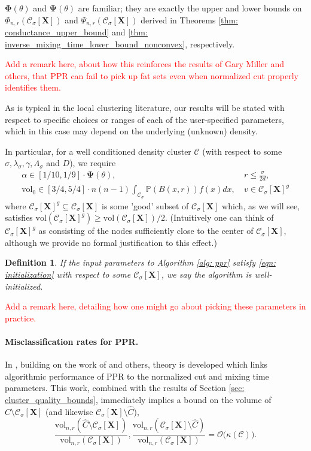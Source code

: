 \documentclass{article}
\newcommand{\vol}{\mathrm{vol}}
\newcommand{\1}{\mathbf{1}}
\newcommand{\Phibf}{\mathbf{\Phi}}
\newcommand{\Psibf}{\mathbf{\Psi}}
\newcommand{\Xbf}{\mathbf{X}}
\newcommand{\Pbb}{\mathbb{P}}
\newcommand{\Cset}{\mathcal{C}}
\newcommand{\Csig}{\Cset_{\sigma}}
\newcommand{\ppr}{{\sc PPR}}
\theoremstyle{aldenthm}
\newtheorem{definition}{Definition}
\theoremstyle{aldenrmrk}
\begin{document}
$\Phibf(\theta)$ and $\Psibf(\theta)$ are familiar; they are exactly the upper and lower bounds on $\Phi_{n,r}(\Csig[\Xbf])$ and $\Psi_{n,r}(\Csig[\Xbf])$ derived in Theorems \ref{thm: conductance_upper_bound} and \ref{thm: inverse_mixing_time_lower_bound_nonconvex}, respectively.

\textcolor{red}{Add a remark here, about how this reinforces the results of Gary Miller and others, that PPR can fail to pick up fat sets even when normalized cut properly identifies them.}

As is typical in the local clustering literature, our results will be stated with respect to specific choices or ranges of each of the user-specified parameters, which in this case may depend on the underlying (unknown) density. 

In particular, for a well conditioned density cluster $\Cset$ (with respect to some $\sigma, \lambda_{\sigma}, \gamma, \Lambda_{\sigma}$ and $D$), we require
\begin{align}
\label{eqn: initialization}
\alpha \in [1/10, 1/9] \cdot \mathbf{\Psi}(\theta), & ~r \leq \frac{\sigma}{2d} \nonumber,  \\
\vol_0 \in [3/4,5/4] \cdot n(n-1) \int_{\Csig} \Pbb(B(x,r)) f(x) dx, & ~v \in \Csig[\Xbf]^g
\end{align}
where $\Csig[\Xbf]^g \subseteq \Csig[\Xbf]$ is some 'good' subset of $\Csig[\Xbf]$ which, as we will see, satisfies $\vol(\Csig[\Xbf]^g) \geq \vol(\Csig[\Xbf])/2$. (Intuitively one can think of $\Csig[\Xbf]^g$ as consisting of the nodes sufficiently close to the center of $\Csig[\Xbf]$, although we provide no formal justification to this effect.)

\begin{definition}
	If the input parameters to Algorithm \ref{alg: ppr} satisfy \eqref{eqn: initialization} with respect to some $\Csig[\Xbf]$, we say the algorithm is  \emph{well-initialized}.
\end{definition}

\textcolor{red}{Add a remark here, detailing how one might go about picking these parameters in practice.}

\paragraph{Misclassification rates for \ppr.}

In \cite{zhu2013}, building on the work of \cite{andersen2006} and others, theory is developed which links algorithmic performance of PPR to the normalized cut and mixing time parameters. This work, combined with the results of Section \ref{sec: cluster_quality_bounds}, immediately implies a bound on the volume of $\widehat{C} \setminus \Csig[\Xbf]$ (and likewise $\Csig[\Xbf] \setminus \widehat{C}$),
\begin{equation}
\label{eqn: graph_symmetric_set_difference}
\frac{\vol_{n,r}(\widehat{C} \setminus \Csig[\Xbf])}{\vol_{n,r}(\Csig[\Xbf])}, \frac{\vol_{n,r}(\Csig[\Xbf] \setminus \widehat{C})}{\vol_{n,r}(\Csig[\Xbf])} = \mathcal{O}\bigl( \kappa(\Cset) \bigr).
\end{equation}
\end{document}
